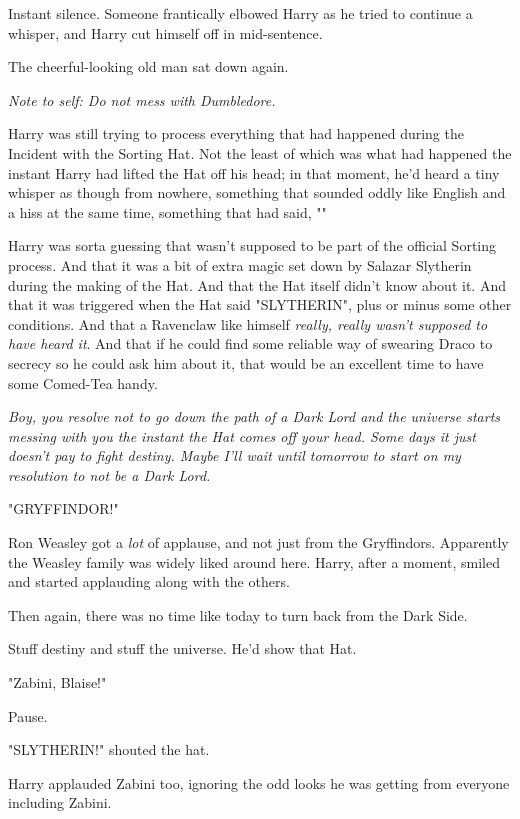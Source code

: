 Instant silence. Someone frantically elbowed Harry as he tried to continue a
whisper, and Harry cut himself off in mid-sentence.

The cheerful-looking old man sat down again.

\emph{Note to self: Do not mess with Dumbledore.}

Harry was still trying to process everything that had happened during the
Incident with the Sorting Hat. Not the least of which was what had happened the
instant Harry had lifted the Hat off his head; in that moment, he'd heard a
tiny whisper as though from nowhere, something that sounded oddly like English
and a hiss at the same time, something that had said, ""

Harry was sorta guessing that wasn't supposed to be part of the official
Sorting process. And that it was a bit of extra magic set down by Salazar
Slytherin during the making of the Hat. And that the Hat itself didn't know
about it. And that it was triggered when the Hat said "SLYTHERIN", plus or
minus some other conditions. And that a Ravenclaw like himself \emph{really,
really wasn't supposed to have heard it}. And that if he could find some
reliable way of swearing Draco to secrecy so he could ask him about it, that
would be an excellent time to have some Comed-Tea handy.

\emph{Boy, you resolve not to go down the path of a Dark Lord and the universe
starts messing with you the instant the Hat comes off your head. Some days it
just doesn't pay to fight destiny. Maybe I'll wait until tomorrow to start on
my resolution to not be a Dark Lord.}

"GRYFFINDOR!"

Ron Weasley got a \emph{lot} of applause, and not just from the Gryffindors.
Apparently the Weasley family was widely liked around here. Harry, after a
moment, smiled and started applauding along with the others.

Then again, there was no time like today to turn back from the Dark Side.

Stuff destiny and stuff the universe. He'd show that Hat.

"Zabini, Blaise!"

Pause.

"SLYTHERIN!" shouted the hat.

Harry applauded Zabini too, ignoring the odd looks he was getting from everyone
including Zabini.

